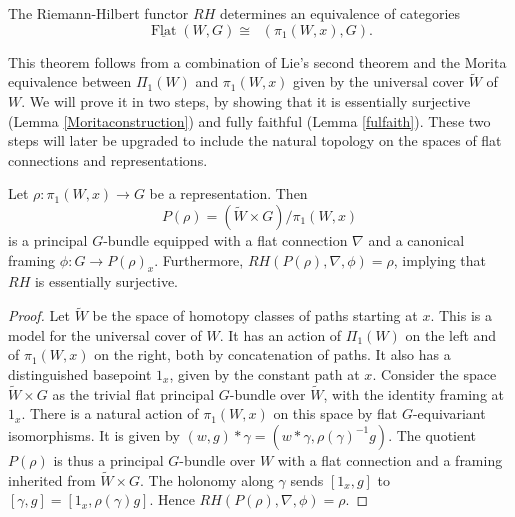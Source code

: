 \documentclass[10pt]{amsart}
\newcommand{\FlatCat}{{\underline{\operatorname{Flat}}}}
\DeclareMathOperator{\Rep}{\underline{\operatorname{Rep}}}
\numberwithin{theoremalpha}{section}
\numberwithin{equation}{section}
\numberwithin{definition}{section}
\numberwithin{theorem}{section}
\numberwithin{proposition}{section}
\numberwithin{lemma}{section}
\numberwithin{example}{section}
\numberwithin{remark}{section}
\numberwithin{corollary}{section}
\numberwithin{question}{section}
\numberwithin{problem}{section}
\numberwithin{assumption}{section}
\theoremstyle{named}
\numberwithin{equation}{section}
\begin{document}
\begin{theorem} \label{MainRHtheorem}
The Riemann-Hilbert functor $RH$ determines an equivalence of categories 
\[  \FlatCat(W,G) \cong \Rep(\pi_{1}(W, x), G). \]
\end{theorem}

This theorem follows from a combination of Lie's second theorem and the Morita equivalence between $\Pi_{1}(W)$ and $\pi_{1}(W, x)$ given by the universal cover $\widetilde{W}$ of $W$. We will prove it in two steps, by showing that it is essentially surjective (Lemma \ref{Moritaconstruction}) and fully faithful (Lemma \ref{fulfaith}). These two steps will later be upgraded to include the natural topology on the spaces of flat connections and representations. 

\begin{lemma} \label{Moritaconstruction}
Let $\rho: \pi_{1}(W, x) \to G$ be a representation. Then 
\[ P(\rho) = (\widetilde{W} \times G )/\pi_{1}(W,x) \]
is a principal $G$-bundle equipped with a flat connection $\nabla$ and a canonical framing $\phi : G \to P(\rho)_{x}$. Furthermore, $RH(P(\rho), \nabla, \phi) = \rho$, implying that $RH$ is essentially surjective. 
\end{lemma}
\begin{proof}
Let $\widetilde{W}$ be the space of homotopy classes of paths starting at $x$. This is a model for the universal cover of $W$. It has an action of $\Pi_{1}(W)$ on the left and of $\pi_{1}(W,x)$ on the right, both by concatenation of paths. It also has a distinguished basepoint $1_{x}$, given by the constant path at $x$. Consider the space $\widetilde{W} \times G$ as the trivial flat principal $G$-bundle over $\widetilde{W}$, with the identity framing at $1_{x}$. There is a natural action of $\pi_{1}(W,x)$ on this space by flat $G$-equivariant isomorphisms. It is given by $(w, g) \ast \gamma = (w \ast \gamma, \rho(\gamma)^{-1} g)$. The quotient $P(\rho)$ is thus a principal $G$-bundle over $W$ with a flat connection and a framing inherited from $\widetilde{W} \times G$. The holonomy along $\gamma$ sends $[1_{x}, g]$ to $[\gamma, g] = [1_{x}, \rho(\gamma)g]$. Hence  $RH(P(\rho), \nabla, \phi) = \rho$.  
\end{proof}
\end{document}
